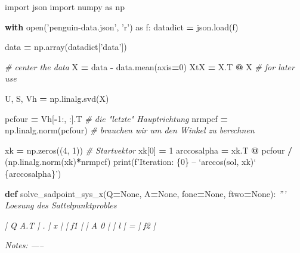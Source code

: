 \documentclass[]{book}
\newenvironment{Shaded}{\begin{snugshade}}{\end{snugshade}}
\newcommand{\BuiltInTok}[1]{#1}
\newcommand{\CommentTok}[1]{\textcolor[rgb]{0.56,0.35,0.01}{\textit{#1}}}
\newcommand{\ControlFlowTok}[1]{\textcolor[rgb]{0.13,0.29,0.53}{\textbf{#1}}}
\newcommand{\DecValTok}[1]{\textcolor[rgb]{0.00,0.00,0.81}{#1}}
\newcommand{\ImportTok}[1]{#1}
\newcommand{\KeywordTok}[1]{\textcolor[rgb]{0.13,0.29,0.53}{\textbf{#1}}}
\newcommand{\NormalTok}[1]{#1}
\newcommand{\OperatorTok}[1]{\textcolor[rgb]{0.81,0.36,0.00}{\textbf{#1}}}
\newcommand{\SpecialCharTok}[1]{\textcolor[rgb]{0.00,0.00,0.00}{#1}}
\newcommand{\SpecialStringTok}[1]{\textcolor[rgb]{0.31,0.60,0.02}{#1}}
\newcommand{\StringTok}[1]{\textcolor[rgb]{0.31,0.60,0.02}{#1}}
\newcommand{\VariableTok}[1]{\textcolor[rgb]{0.00,0.00,0.00}{#1}}
\theoremstyle{definition}
\theoremstyle{definition}
\theoremstyle{definition}
\theoremstyle{definition}
\theoremstyle{remark}
\begin{document}
\begin{Shaded}
\begin{Highlighting}[]
\ImportTok{import}\NormalTok{ json}
\ImportTok{import}\NormalTok{ numpy }\ImportTok{as}\NormalTok{ np}

\ControlFlowTok{with} \BuiltInTok{open}\NormalTok{(}\StringTok{'penguin-data.json'}\NormalTok{, }\StringTok{'r'}\NormalTok{) }\ImportTok{as}\NormalTok{ f:}
\NormalTok{    datadict }\OperatorTok{=}\NormalTok{ json.load(f)}

\NormalTok{data }\OperatorTok{=}\NormalTok{ np.array(datadict[}\StringTok{'data'}\NormalTok{])}

\CommentTok{# center the data}
\NormalTok{X }\OperatorTok{=}\NormalTok{ data }\OperatorTok{-}\NormalTok{ data.mean(axis}\OperatorTok{=}\DecValTok{0}\NormalTok{)}
\NormalTok{XtX }\OperatorTok{=}\NormalTok{ X.T }\OperatorTok{@}\NormalTok{ X  }\CommentTok{# for later use}

\NormalTok{U, S, Vh }\OperatorTok{=}\NormalTok{ np.linalg.svd(X)}

\NormalTok{pcfour }\OperatorTok{=}\NormalTok{ Vh[}\OperatorTok{-}\DecValTok{1}\NormalTok{:, :].T  }\CommentTok{# die "letzte" Hauptrichtung}
\NormalTok{nrmpcf }\OperatorTok{=}\NormalTok{ np.linalg.norm(pcfour)  }\CommentTok{# brauchen wir um den Winkel zu berechnen}

\NormalTok{xk }\OperatorTok{=}\NormalTok{ np.zeros((}\DecValTok{4}\NormalTok{, }\DecValTok{1}\NormalTok{))  }\CommentTok{# Startvektor}
\NormalTok{xk[}\DecValTok{0}\NormalTok{] }\OperatorTok{=} \DecValTok{1}
\NormalTok{arccosalpha }\OperatorTok{=}\NormalTok{ xk.T }\OperatorTok{@}\NormalTok{ pcfour }\OperatorTok{/}\NormalTok{ (np.linalg.norm(xk)}\OperatorTok{*}\NormalTok{nrmpcf)}
\BuiltInTok{print}\NormalTok{(}\SpecialStringTok{f'Iteration: }\SpecialCharTok{\{}\DecValTok{0}\SpecialCharTok{\}}\SpecialStringTok{ -- `arccos(sol, xk)` }\SpecialCharTok{\{}\NormalTok{arccosalpha}\SpecialCharTok{\}}\SpecialStringTok{'}\NormalTok{)}


\KeywordTok{def}\NormalTok{ solve_sadpoint_sys_x(Q}\OperatorTok{=}\VariableTok{None}\NormalTok{, A}\OperatorTok{=}\VariableTok{None}\NormalTok{, fone}\OperatorTok{=}\VariableTok{None}\NormalTok{, ftwo}\OperatorTok{=}\VariableTok{None}\NormalTok{):}
    \CommentTok{''' Loesung des Sattelpunktprobles}

\CommentTok{    | Q  A.T | . | x |    | f1 |}
\CommentTok{    | A   0  |   | l |  = | f2 |}

\CommentTok{    Notes:}
\CommentTok{    -----}


\end{Highlighting}
\end{Shaded}
\end{document}
